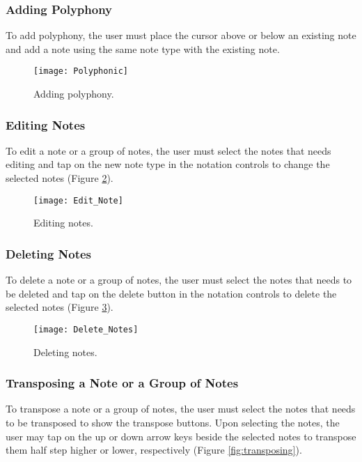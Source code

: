 \subsubsection{Adding Polyphony}
To add polyphony, the user must place the cursor above or below an existing note and add a note using the same note type with the existing note.

\begin{figure}[H]
	\centering
	\texttt{[image: Polyphonic]}
    \caption{Adding polyphony.}
    \label{fig:polyphony}
\end{figure}

\subsubsection{Editing Notes}
To edit a note or a group of notes, the user must select the notes that needs editing and tap on the new note type in the notation controls to change the selected notes (Figure \ref{fig:edit-note}).

\begin{figure}[H]
	\centering
	\texttt{[image: Edit\_Note]}
    \caption{Editing notes.}
    \label{fig:edit-note}
\end{figure}

\subsubsection{Deleting Notes}
To delete a note or a group of notes, the user must select the notes that needs to be deleted and tap on the delete button in the notation controls to delete the selected notes (Figure \ref{fig:delete-notes}).

\begin{figure}[H]
	\centering
	\texttt{[image: Delete\_Notes]}
    \caption{Deleting notes.}
    \label{fig:delete-notes}
\end{figure}

\subsubsection{Transposing a Note or a Group of Notes}
To transpose a note or a group of notes, the user must select the notes that needs to be transposed to show the transpose buttons. Upon selecting the notes, the user may tap on the up or down arrow keys beside the selected notes to transpose them half step higher or lower, respectively (Figure \ref{fig:transposing}).

